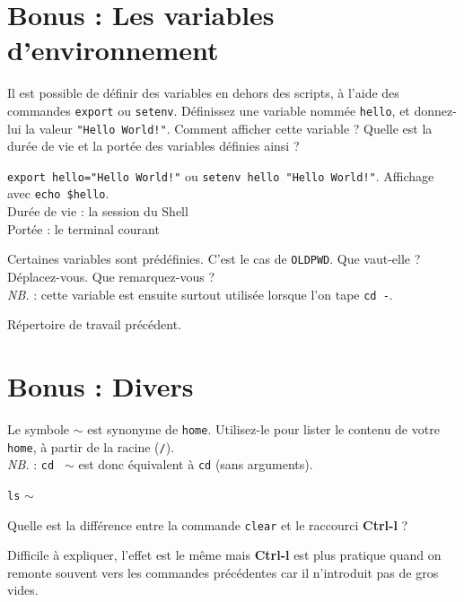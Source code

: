 \documentclass{scrartcl}
\begin{document}
\section{Bonus : Les variables d'environnement}

\begin{question}[name=Q.]
Il est possible de définir des variables en dehors des scripts, à l'aide des commandes \lstinline|export| ou \lstinline|setenv|. Définissez une variable nommée \lstinline|hello|, et donnez-lui la valeur \lstinline|"Hello World!"|. Comment afficher cette variable ? Quelle est la durée de vie et la portée des variables définies ainsi ?
\end{question}
\begin{solution}
	\lstinline|export hello="Hello World!"| ou \lstinline|setenv hello "Hello World!"|.
	Affichage avec \lstinline|echo $hello|.\\
	Durée de vie : la session du Shell\\
	Portée : le terminal courant
\end{solution}

\begin{question}[name=Q.]
	Certaines variables sont prédéfinies. C'est le cas de \lstinline|OLDPWD|. Que vaut-elle ? Déplacez-vous. Que remarquez-vous ? \\
	\textit{NB.} : cette variable est ensuite surtout utilisée lorsque l'on tape \lstinline|cd -|.
\end{question}
\begin{solution}
	Répertoire de travail précédent.
\end{solution}

\section{Bonus : Divers}

\begin{question}[name=Q.]
	Le symbole $\sim$ est synonyme de \lstinline|home|. Utilisez-le pour lister le contenu de votre \lstinline|home|, à partir de la racine (\lstinline|/|). \\
	\textit{NB.} : \lstinline|cd | $\sim$ est donc équivalent à \lstinline|cd| (sans arguments).
\end{question}
\begin{solution}
	\lstinline|ls| $\sim$
\end{solution}

\begin{question}[name=Q.]
	Quelle est la différence entre la commande \lstinline|clear| et le raccourci \textbf{Ctrl-l} ?
\end{question}
\begin{solution}
	Difficile à expliquer, l'effet est le même mais \textbf{Ctrl-l} est plus pratique quand on remonte souvent vers les commandes précédentes car il n'introduit pas de gros vides.
\end{solution}
\end{document}
